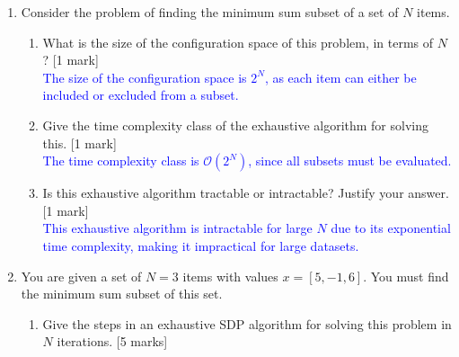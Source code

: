 \begin{enumerate}
{    } 
    \item[(d)] Consider the problem of finding the minimum sum subset of a set of $N$ items.
    \begin{enumerate}
        \item[(i)] What is the size of the configuration space of this problem, in terms of $N$? [1 mark] \\
        \textcolor{blue}{The size of the configuration space is $2^N$, as each item can either be included or excluded from a subset.} 
        \item[(ii)] Give the time complexity class of the exhaustive algorithm for solving this. [1 mark] \\
        \textcolor{blue}{The time complexity class is $\mathcal{O}(2^N)$, since all subsets must be evaluated.} 
        \item[(iii)] Is this exhaustive algorithm tractable or intractable? Justify your answer. [1 mark] \\
        \textcolor{blue}{This exhaustive algorithm is intractable for large $N$ due to its exponential time complexity, making it impractical for large datasets.} 
    \end{enumerate}
    \item[(e)] You are given a set of $N = 3$ items with values $x = [5, -1, 6]$. You must find the minimum sum subset of this set.
    \begin{enumerate}
        \item[(i)] Give the steps in an exhaustive SDP algorithm for solving this problem in $N$ iterations. [5 marks]



\end{enumerate}
\end{enumerate}
